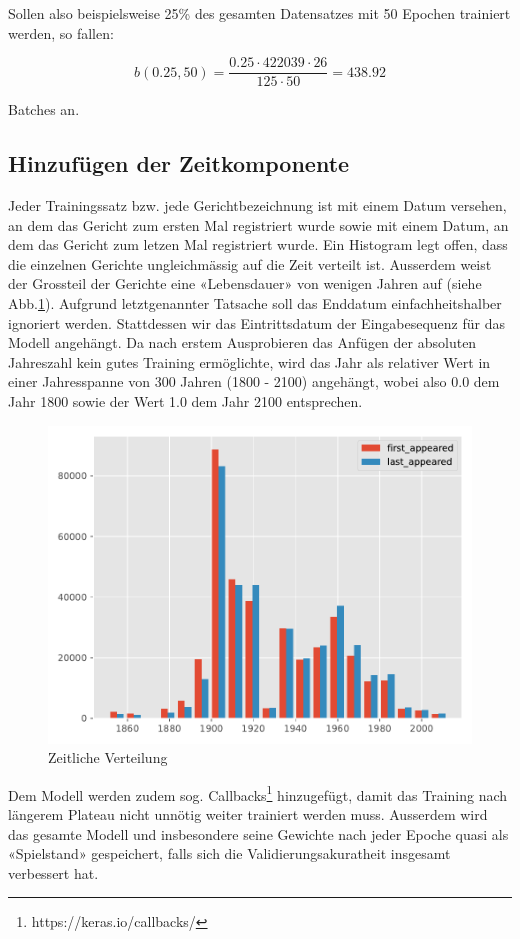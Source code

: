 Sollen also beispielsweise 25\% des gesamten Datensatzes mit 50 Epochen trainiert werden, so fallen:

\[ b(0.25, 50) = \frac{0.25 \cdot 422039 \cdot 26}{125 \cdot 50} = 438.92 \]

Batches an.

\subsection{Hinzufügen der Zeitkomponente}
\label{subsec:adding-time-component}

Jeder Trainingssatz bzw. jede Gerichtbezeichnung ist mit einem Datum versehen, an dem das Gericht zum ersten Mal
registriert wurde sowie mit einem Datum, an dem das Gericht zum letzen Mal registriert wurde.
Ein Histogram legt offen, dass die einzelnen Gerichte ungleichmässig auf die Zeit verteilt ist.
Ausserdem weist der Grossteil der Gerichte eine «Lebensdauer» von wenigen Jahren auf (siehe Abb.\ref{fig:hist-dates-datespans}).
Aufgrund letztgenannter Tatsache soll das Enddatum einfachheitshalber ignoriert werden.
Stattdessen wir das Eintrittsdatum der Eingabesequenz für das Modell angehängt.
Da nach erstem Ausprobieren das Anfügen der absoluten Jahreszahl kein gutes Training ermöglichte, wird das Jahr
als relativer Wert in einer Jahresspanne von 300 Jahren (1800 - 2100) angehängt, wobei also 0.0 dem Jahr 1800 sowie
der Wert 1.0 dem Jahr 2100 entsprechen.

\begin{figure}
    \centering
    \includegraphics[width=0.75\linewidth]{images/analysis/histogram-dates.pdf}
    \caption{Zeitliche Verteilung}
    \label{fig:hist-dates-datespans}
\end{figure}

Dem Modell werden zudem sog. Callbacks\footnote{https://keras.io/callbacks/} hinzugefügt, damit das Training nach
längerem Plateau nicht unnötig weiter trainiert werden muss.
Ausserdem wird das gesamte Modell und insbesondere seine Gewichte nach jeder Epoche quasi als «Spielstand» gespeichert,
falls sich die Validierungsakuratheit insgesamt verbessert hat.
